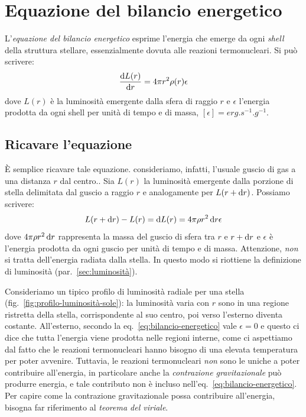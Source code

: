 \section{Equazione del bilancio energetico}\label{sec:bilancio-energetico}
L'\emph{equazione del bilancio energetico} esprime l'energia che emerge da ogni \emph{shell} della struttura stellare, essenzialmente dovuta alle reazioni termonucleari. Si può scrivere:
\begin{equation}\label{eq:bilancio-energetico}
    \dfrac{\mathop{\mathrm{{}d}}\mathopen{} L(r)}{\mathop{\mathrm{{}d}}\mathopen{} r} = 4 \pi r^2 \rho(r) \epsilon
\end{equation}
dove $L(r)$ è la luminosità emergente dalla sfera di raggio $r$ e $\epsilon$ l'energia prodotta da ogni shell per unità di tempo e di massa, $[\epsilon] = \si{erg.s^{-1}.g^{-1}}$.

\subsection{Ricavare l'equazione}
È semplice ricavare tale equazione. consideriamo, infatti, l'usuale guscio di gas a una distanza $r$ dal centro.. Sia $L(r)$ la luminosità emergente dalla porzione di stella delimitata dal guscio a raggio $r$ e analogamente per $L(r + \mathop{\mathrm{{}d}}\mathopen{} r)$. Possiamo scrivere:
\[
L(r + \mathop{\mathrm{{}d}}\mathopen{} r) - L(r) = \mathop{\mathrm{{}d}}\mathopen{} L(r) = 4 \pi \rho r^2 \mathop{\mathrm{{}d}}\mathopen{} r \epsilon
\]
dove $4 \pi \rho r^2 \mathop{\mathrm{{}d}}\mathopen{} r$ rappresenta la massa del guscio di sfera tra $r$ e $r + \mathop{\mathrm{{}d}}\mathopen{} r$ e $\epsilon$ è l'energia prodotta da ogni guscio per unità di tempo e di massa. Attenzione, \emph{non} si tratta dell'energia radiata dalla stella. In questo modo si riottiene la definizione di luminosità (par.~\ref{sec:luminosità}).

Consideriamo un tipico profilo di luminosità radiale per una stella (fig.~\ref{fig:profilo-luminosità-sole}): la luminosità varia con $r$ sono in una regione ristretta della stella, corrispondente al suo centro, poi verso l'esterno diventa costante. All'esterno, secondo la eq.~\eqref{eq:bilancio-energetico} vale $\epsilon = 0$ e questo ci dice che tutta l'energia viene prodotta nelle regioni interne, come ci aspettiamo dal fatto che le reazioni termonucleari hanno bisogno di una elevata temperatura per poter avvenire. Tuttavia, le reazioni termonucleari \emph{non} sono le uniche a poter contribuire all'energia, in particolare anche la \emph{contrazione gravitazionale} può produrre energia, e tale contributo non è incluso nell'eq.~\eqref{eq:bilancio-energetico}. Per capire come la contrazione gravitazionale possa contribuire all'energia, bisogna far riferimento al \emph{teorema del viriale}.

